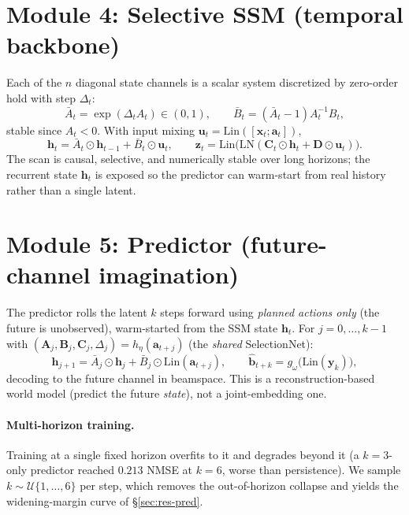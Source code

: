 \documentclass[11pt]{article}
\newcommand{\xv}{\mathbf{x}}
\newcommand{\zv}{\mathbf{z}}
\newcommand{\av}{\mathbf{a}}
\newcommand{\hv}{\mathbf{h}}
\newcommand{\uv}{\mathbf{u}}
\newcommand{\bs}{\mathbf{b}}
\begin{document}
\section{Module 4: Selective SSM (temporal backbone)}\label{sec:ssm}

Each of the $n$ diagonal state channels is a scalar system discretized by zero-order hold with step
$\Delta_t$:
\begin{equation}
\bar A_t=\exp(\Delta_t A_t)\in(0,1),\qquad \bar B_t=(\bar A_t-1)A_t^{-1}B_t,
\end{equation}
stable since $A_t<0$. With input mixing $\uv_t=\mathrm{Lin}([\xv_t;\av_t])$,
\begin{equation}
\hv_t=\bar A_t\odot\hv_{t-1}+\bar B_t\odot\uv_t,\qquad
\zv_t=\mathrm{Lin}\big(\mathrm{LN}(\mathbf C_t\odot\hv_t+\mathbf D\odot\uv_t)\big).
\end{equation}
The scan is causal, selective, and numerically stable over long horizons; the recurrent state $\hv_t$
is exposed so the predictor can warm-start from real history rather than a single latent.

\section{Module 5: Predictor (future-channel imagination)}\label{sec:predictor}

The predictor rolls the latent $k$ steps forward using \emph{planned actions only} (the future is
unobserved), warm-started from the SSM state $\hv_t$. For $j=0,\dots,k-1$ with
$(\mathbf A_j,\mathbf B_j,\mathbf C_j,\Delta_j)=h_\eta(\av_{t+j})$ (the \emph{shared} SelectionNet):
\begin{equation}
\hv_{j+1}=\bar A_j\odot\hv_j+\bar B_j\odot\mathrm{Lin}(\av_{t+j}),\qquad
\hat{\bs}_{t+k}=g_\omega\big(\mathrm{Lin}(\mathbf y_k)\big),
\end{equation}
decoding to the future channel in beamspace. This is a reconstruction-based world model (predict the
future \emph{state}), not a joint-embedding one.

\paragraph{Multi-horizon training.} Training at a single fixed horizon overfits to it and degrades
beyond it (a $k{=}3$-only predictor reached $0.213$ NMSE at $k{=}6$, worse than persistence). We
sample $k\sim\mathcal U\{1,\dots,6\}$ per step, which removes the out-of-horizon collapse and yields
the widening-margin curve of \S\ref{sec:res-pred}.
\end{document}
